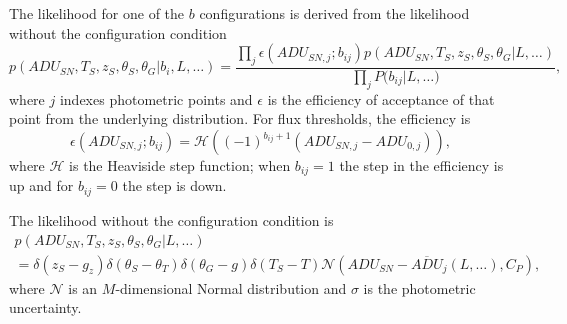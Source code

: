 \documentclass[preprint,3p]{elsarticle}
\begin{document}
The likelihood for one of the $b$ configurations is derived from the likelihood without the configuration condition
\begin{equation}
p(\mathit{ADU}_{SN}, {{T}}_S,{{z}}_S, \theta_{S}, \theta_G | b_i, L, \ldots)
  =  \frac{ \prod_j
 \epsilon(\mathit{ADU}_{SN,j}; b_{ij})
  p(\mathit{ADU}_{SN}, {{T}}_S,{{z}}_S, \theta_{S}, \theta_G | L, \ldots)}
  {\prod_j P(b_{ij}{ |L,\dots)}} ,
\label{obsconf:eqn}
\end{equation}
where $j$ indexes photometric points and
$\epsilon$ is the efficiency of acceptance of that point from the underlying distribution.
For flux thresholds, the efficiency is
\begin{equation}
\epsilon(\mathit{ADU}_{SN,j}; b_{ij})= \mathcal{H}\left((-1)^{b_{ij}+1}(ADU_{SN,j}-ADU_{0,j})\right),
\end{equation}
where $\mathcal{H}$ is the Heaviside step function; when $b_{ij}=1$ the step in the efficiency
is up and for $b_{ij}=0$ the step is down.

The likelihood without the configuration condition is
\begin{multline}
p(\mathit{ADU}_{SN}, {{T}}_S,{{z}}_S, \theta_{S}, \theta_G | L, \ldots) \\
= \delta(z_S - g_z) \delta(\theta_S-\theta_T) \delta(\theta_G -g) \delta(T_S-T)  \mathcal{N}
\left(\mathit{ADU}_{SN} -\overline{\mathit{ADU}}_j(L ,\ldots), C_P \right),
\end{multline}
where $\mathcal{N}$ is an $M$-dimensional Normal distribution
and $\sigma$ is the photometric uncertainty. 


%
\end{document}
